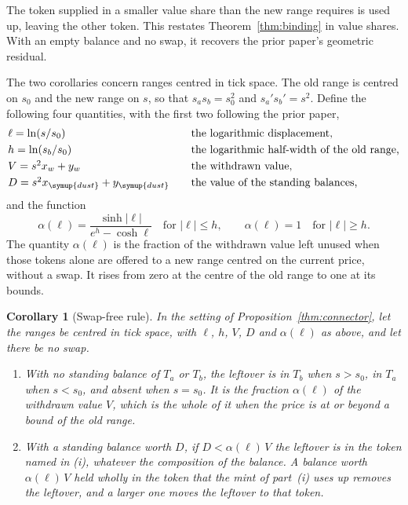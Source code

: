 \documentclass[11pt,a4paper]{article}
\theoremstyle{siphon}
\newtheorem{corollary}{Corollary}
\begin{document}
\noindent The token supplied in a smaller value share than the new range requires is used up, leaving the other token. This restates Theorem~\ref{thm:binding} in value shares. With an empty balance and no swap, it recovers the prior paper's geometric residual\cite{ryan2026siphon}.

The two corollaries concern ranges centred in tick space. The old range is centred on $s_0$ and the new range on $s$, so that $s_a s_b = s_0^2$ and $s_a' s_b' = s^2$. Define the following four quantities, with the first two following the prior paper\cite{ryan2026siphon},
\[
\begin{array}{@{}l@{\qquad}l@{}}
\ell = \ln(s/s_0) & \text{the logarithmic displacement,} \\[3pt]
h = \ln(s_b/s_0) & \text{the logarithmic half-width of the old range,} \\[3pt]
V = s^2 x_w + y_w & \text{the withdrawn value,} \\[3pt]
D = s^2 x_{\symup{dust}} + y_{\symup{dust}} & \text{the value of the standing balances,}
\end{array}
\]
and the function
\[
\alpha(\ell) = \frac{\sinh|\ell|}{e^{h} - \cosh\ell} \quad \text{for } |\ell| \leq h, \qquad \alpha(\ell) = 1 \quad \text{for } |\ell| \geq h .
\]
The quantity $\alpha(\ell)$ is the fraction of the withdrawn value left unused when those tokens alone are offered to a new range centred on the current price, without a swap. It rises from zero at the centre of the old range to one at its bounds.

\begin{corollary}[Swap-free rule]\label{cor:swapfree}
In the setting of Proposition~\ref{thm:connector}, let the ranges be centred in tick space, with $\ell$, $h$, $V$, $D$ and $\alpha(\ell)$ as above, and let there be no swap.
\begin{enumerate}[leftmargin=*,label=(\roman*)]
\item With no standing balance of $T_a$ or $T_b$, the leftover is in $T_b$ when $s > s_0$, in $T_a$ when $s < s_0$, and absent when $s = s_0$. It is the fraction $\alpha(\ell)$ of the withdrawn value $V$, which is the whole of it when the price is at or beyond a bound of the old range.
\item With a standing balance worth $D$, if $D < \alpha(\ell)\,V$ the leftover is in the token named in (i), whatever the composition of the balance. A balance worth $\alpha(\ell)\,V$ held wholly in the token that the mint of part~(i) uses up removes the leftover, and a larger one moves the leftover to that token.
\end{enumerate}
\end{corollary}
\end{document}
